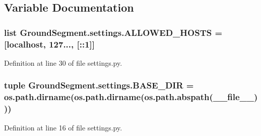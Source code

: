 \subsection{Variable Documentation}
\hypertarget{namespace_ground_segment_1_1settings_ae76a78e05b49fb40b628ba756d926bc9}{}
\subsubsection[{A\+L\+L\+O\+W\+E\+D\+\_\+\+H\+O\+S\+T\+S}]{\setlength{\rightskip}{0pt plus 5cm}list Ground\+Segment.\+settings.\+A\+L\+L\+O\+W\+E\+D\+\_\+\+H\+O\+S\+T\+S = \mbox{[}\textquotesingle{}localhost\textquotesingle{}, \textquotesingle{}127...\textquotesingle{}, \textquotesingle{}\mbox{[}\+::1\mbox{]}\textquotesingle{}\mbox{]}}\label{namespace_ground_segment_1_1settings_ae76a78e05b49fb40b628ba756d926bc9}


Definition at line 30 of file settings.\+py.

\hypertarget{namespace_ground_segment_1_1settings_a96d9de6863371f2594631eee01ef0600}{}
\subsubsection[{B\+A\+S\+E\+\_\+\+D\+I\+R}]{\setlength{\rightskip}{0pt plus 5cm}tuple Ground\+Segment.\+settings.\+B\+A\+S\+E\+\_\+\+D\+I\+R = os.\+path.\+dirname(os.\+path.\+dirname(os.\+path.\+abspath(\+\_\+\+\_\+file\+\_\+\+\_\+)))}\label{namespace_ground_segment_1_1settings_a96d9de6863371f2594631eee01ef0600}


Definition at line 16 of file settings.\+py.

\hypertarget{namespace_ground_segment_1_1settings_a73f9e9739e7dccd65add635931f4f98e}{}
